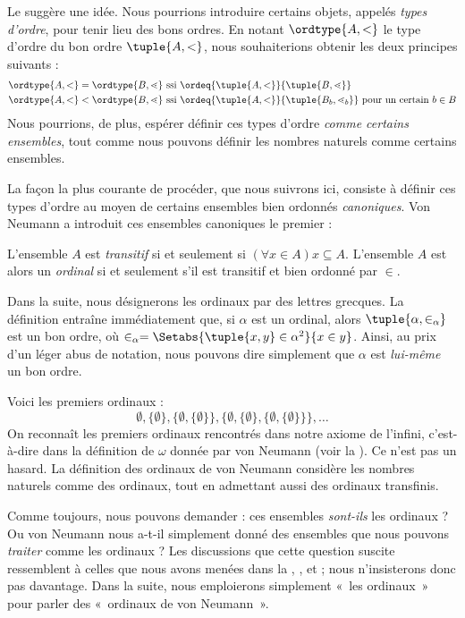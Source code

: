 \documentclass[../../../include/open-logic-section]{subfiles}
\begin{document}

Le  suggère une idée.
Nous pourrions introduire certains objets, appelés \emph{types
d'ordre}, pour tenir lieu des bons ordres. En notant $\ordtype{A, <}$
le type d'ordre du bon ordre $\tuple{A, <}$, nous souhaiterions obtenir
les deux principes suivants :
\begin{align*}
	\ordtype{A, <} = \ordtype{B, \lessdot} &
	\text{ ssi } \ordeq{\tuple{A, <}}{\tuple{B, \lessdot}}\\
	\ordtype{A, <} < \ordtype{B, \lessdot}&
	\text{ ssi }\ordeq{\tuple{A, <}}{\tuple{B_b, \lessdot_b}}\text{ pour un certain }b \in B
\end{align*}
Nous pourrions, de plus, espérer définir ces types d'ordre \emph{comme
certains ensembles}, tout comme nous pouvons définir les nombres
naturels comme certains ensembles.

La façon la plus courante de procéder, que nous suivrons ici, consiste
à définir ces types d'ordre au moyen de certains ensembles bien
ordonnés \emph{canoniques}. Von Neumann a introduit ces ensembles
canoniques le premier :

\begin{defn}
L'ensemble $A$ est \emph{transitif} si et seulement si
$(\forall x \in A)x \subseteq A$. L'ensemble $A$ est alors un
\emph{ordinal} si et seulement s'il est transitif et bien ordonné par
$\in$.
\end{defn}
\noindent
Dans la suite, nous désignerons les ordinaux par des lettres grecques.
La définition entraîne immédiatement que, si $\alpha$ est un ordinal,
alors $\tuple{\alpha, \in_\alpha}$ est un bon ordre, où
$\in_\alpha = \Setabs{\tuple{x, y} \in \alpha^2}{x \in y}$. Ainsi,
au prix d'un léger abus de notation, nous pouvons dire simplement que
$\alpha$ est \emph{lui-même} un bon ordre.

Voici les premiers ordinaux :
\[
	\emptyset, \{\emptyset\},
	\{\emptyset, \{\emptyset\}\},
	\{\emptyset, \{\emptyset\}, \{\emptyset, \{\emptyset\}\}\}, \ldots
\]
On reconnaît les premiers ordinaux rencontrés dans notre axiome de
l'infini, c'est-à-dire dans la définition de $\omega$ donnée par von
Neumann (voir la ). Ce n'est pas un
hasard. La définition des ordinaux de von Neumann considère les
nombres naturels comme des ordinaux, tout en admettant aussi des
ordinaux transfinis.

Comme toujours, nous pouvons demander : ces ensembles \emph{sont-ils}
les ordinaux ? Ou von Neumann nous a-t-il simplement donné des
ensembles que nous pouvons \emph{traiter} comme les ordinaux ? Les
discussions que cette question suscite ressemblent à celles que nous
avons menées dans la ,
,
 et
 ; nous n'insisterons donc pas davantage.
Dans la suite, nous emploierons simplement «~les ordinaux~» pour
parler des «~ordinaux de von Neumann~».
\end{document}
